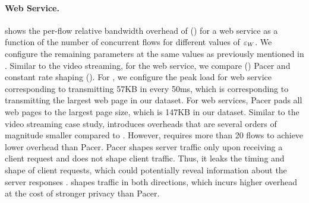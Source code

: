 \paragraph{Web Service.}
 shows the per-flow relative bandwidth overhead of {\sys} ({\ns}) for a web service as a function of the number of concurrent flows for different values of $\varepsilon_{W}$.
We configure the remaining parameters at the same values as previously mentioned in .
Similar to the video streaming, for the web service, we compare {\sys} ({\ns}) Pacer and constant rate shaping ({\constshape}).
For {\constshape}, we configure the peak load for web service corresponding to
transmitting 57KB in every 50ms, which is corresponding to transmitting the largest web page in our dataset.
For web services, Pacer pads all web pages to the largest page size, which is 147KB in our dataset.
Similar to the video streaming case study, {\ns} introduces overheads that are several orders of magnitude smaller compared to {\constshape}.
However, {\ns} requires more than 20 flows to achieve lower overhead than Pacer.
Pacer shapes server traffic only upon receiving a client request and does not
shape client traffic. 
Thus, it leaks the timing and shape of client requests, which could potentially reveal information about the server responses \cite{chen2010reality}.
{\sys} shapes traffic in both directions, which incurs higher overhead at the cost of stronger privacy than Pacer. 